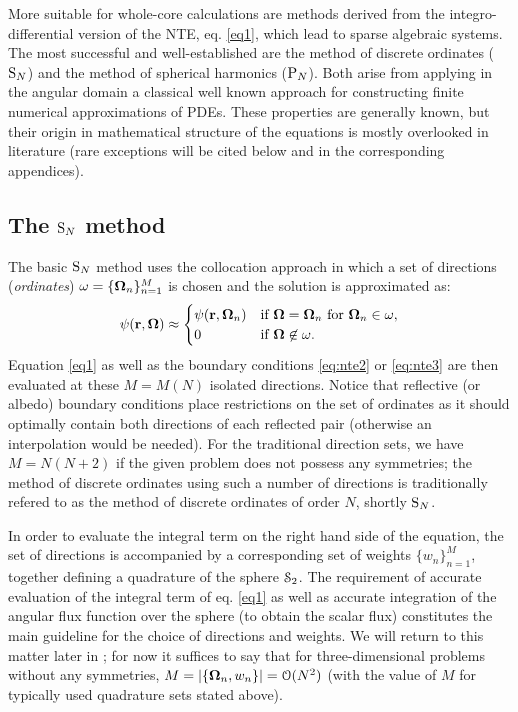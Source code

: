 \vspace*{1em}
More suitable for whole-core calculations are methods derived from the integro-differential
version of the NTE, eq.
\eqref{eq1}, which lead to sparse algebraic systems. The most successful and well-established are the method
of discrete ordinates ($\text{S}_{N}$) and the method of spherical harmonics ($\text{P}_{N}$).
Both arise from applying in the
angular domain a classical well known approach for constructing finite numerical
approximations of PDEs.  These properties are
generally known, but their origin in mathematical structure of the equations is mostly overlooked in
literature (rare exceptions will be cited below and in the corresponding appendices). 

\subsection{The $\text{S}_{N}$ method}\label{sec:1-SN}
The basic $\text{S}_{N}$ method uses the collocation approach in which a set of directions (\textit{ordinates})
$\omega = \{\mathbf{\Omega}_n\}_{n=1}^{M}$ is chosen and the solution is approximated as:
\begin{equation}\label{eq:sn_approx} 
	\psi(\mathbf{r}, \mathbf{\Omega}) \approx 
		\begin{cases}\displaystyle \psi(\mathbf{r},\mathbf{\Omega}_n) & \mbox{if $\mathbf{\Omega} = \mathbf{\Omega}_n$ for $\mathbf{\Omega}_n \in \omega$},\\ 0 & \mbox{if $\mathbf{\Omega} \not \in \omega$.} \end{cases} 
\end{equation}
Equation \eqref{eq1} as well as the boundary conditions \eqref{eq:nte2} or \eqref{eq:nte3} are then evaluated at these
$M = M(N)$ isolated directions. Notice that reflective (or albedo) boundary conditions place restrictions on the set of
ordinates as it should optimally contain both directions of each reflected pair (otherwise an interpolation would be
needed). For the traditional direction sets, we have $M = N(N+2)$ if the given problem does not possess any symmetries;
the method of discrete ordinates using such a number of directions is traditionally refered to as the method of 
discrete ordinates of order $N$, shortly $\text{S}_{N}$.

In order to evaluate the integral term on the right hand side of the equation, the set of directions is accompanied by a
corresponding set of weights $\{w_n\}_{n=1}^{M}$, together defining a quadrature of the sphere $\mathcal{S}_2$. The
requirement of accurate evaluation of the integral term of eq.
\eqref{eq1} as well as accurate integration of the angular flux function over the sphere (to obtain the scalar flux)
constitutes the main guideline for the choice of directions and weights. We will return to this matter later in 
; for now it suffices to say that for three-dimensional problems without any symmetries, \mbox{$M = \left|\{\mathbf{\Omega}_n, w_n\}\right| = \mathcal{O}(N^2)$} (with the
value of $M$ for typically used quadrature sets stated above).

